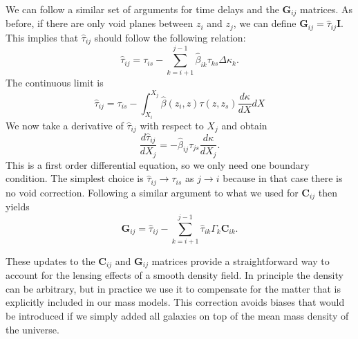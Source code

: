 \documentclass{emulateapj}
\newcommand\C[0]{\mathbf{C}}
\newcommand\I[0]{\mathbf{I}}
\newcommand\G[0]{\mathbf{G}}
\newcommand\betahat{\hat{\beta}}
\newcommand\tauhat{\hat{\tau}}
\begin{document}
We can follow a similar set of arguments for time delays and the $\G_{i j}$ matrices. As before, if there are only void planes between $z_i$ and $z_j$, we can define $\G_{i j} = \tauhat_{i j} \I$. This implies that $\tauhat_{i j}$ should follow the following relation:
\begin{equation}
\tauhat_{i j} = \tau_{i s} - \sum\limits_{k = i + 1}^{j - 1}\betahat_{i k} \tau_{k s} \Delta \kappa_k.
\end{equation}
The continuous limit is
\begin{equation}
\tauhat_{i j}  = \tau_{i s} - \int_{X_i}^{X_j} \betahat(z_i, z) \tau(z, z_s) \frac{d \kappa}{d X} dX
\end{equation}
We now take a derivative of $\tauhat_{i j}$ with respect to $X_j$ and obtain
\begin{equation}
\frac{d \tauhat_{i j}}{d X_j}  = -\betahat_{i j} \tau_{j s} \frac{d \kappa}{d X_j}. 
\end{equation}
This is a first order differential equation, so we only need one boundary condition. The simplest choice is $\tauhat_{i j} \rightarrow \tau_{i s}$ as $j \rightarrow i$ because in that case there is no void correction.  Following a similar argument to what we used for $\C_{i j}$ then yields 
\begin{equation}
\G_{i j} = \tauhat_{i j} - \sum\limits_{k = i + 1}^{j -1} \tauhat_{i k} \Gamma_k \C_{i k}.
\end{equation}

These updates to the $\C_{i j}$ and $\G_{i j}$ matrices provide a straightforward way to account for the lensing effects of a smooth density field.  In principle the density can be arbitrary, but in practice we use it to compensate for the matter that is explicitly included in our mass models.  This correction avoids biases that would be introduced if we simply added all galaxies on top of the mean mass density of the universe.
\end{document}
